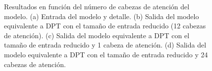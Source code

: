 \begin{figure}[!ht]
\hspace{-3mm}
    
\vspace{-3.5mm}

\hspace{-3mm}
       
\caption{Resultados en función del número de cabezas de atención del modelo. (a) Entrada del modelo y detalle. (b) Salida del modelo equivalente a DPT con el tamaño de entrada reducido (12 cabezas de atención). (c) Salida del modelo equivalente a DPT con el tamaño de entrada reducido y 1 cabeza de atención. (d) Salida del modelo equivalente a DPT con el tamaño de entrada reducido y 24 cabezas de atención.}
    \label{fig:cualitativa-3}
    \end{figure}
\captionsetup[subfigure]{labelformat=parens}



